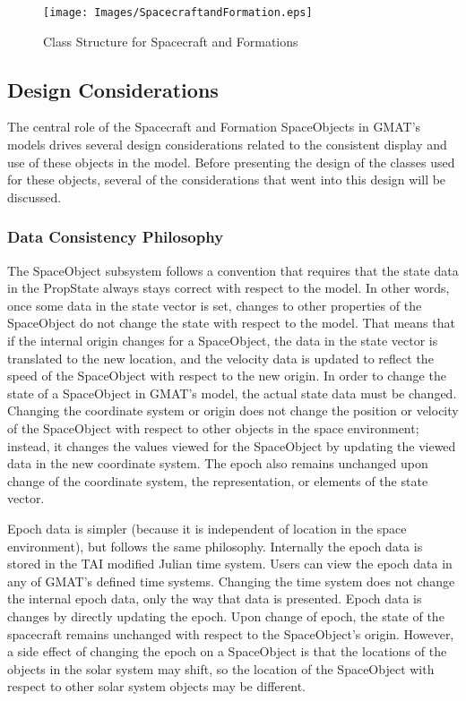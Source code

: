 \begin{figure}
\begin{center}
\texttt{[image: Images/SpacecraftandFormation.eps]}
\caption{\label{figure:SpacecraftandFormation}Class Structure for Spacecraft and Formations}
\end{center}
\end{figure}

\subsection{Design Considerations}

The central role of the Spacecraft and Formation SpaceObjects in GMAT's models drives several
design considerations related to the consistent display and use of these objects in the model.
Before presenting the design of the classes used for these objects, several of the considerations
that went into this design will be discussed.

\subsubsection{Data Consistency Philosophy}

The SpaceObject subsystem follows a convention that requires that the state data in the PropState
always stays correct with respect to the model.  In other words, once some data in the state vector
is set, changes to other properties of the SpaceObject do not change the state with respect to the
model.  That means that if the internal origin changes for a SpaceObject, the data in the state
vector is translated to the new location, and the velocity data is updated to reflect the speed of
the SpaceObject with respect to the new origin.  In order to change the state of a SpaceObject in
GMAT's model, the actual state data must be changed.  Changing the coordinate system or origin does
not change the position or velocity of the SpaceObject with respect to other objects in the space
environment; instead, it changes the values viewed for the SpaceObject by updating the viewed data
in the new coordinate system.  The epoch also remains unchanged upon change of the coordinate
system, the representation, or elements of the state vector.

Epoch data is simpler (because it is independent of location in the space environment), but follows
the same philosophy.  Internally the epoch data is stored in the TAI modified Julian time system.
Users can view the epoch data in any of GMAT's defined time systems.  Changing the time system does
not change the internal epoch data, only the way that data is presented.  Epoch data is changes by
directly updating the epoch.  Upon change of epoch, the state of the spacecraft remains unchanged
with respect to the SpaceObject's origin.  However, a side effect of changing the epoch on a
SpaceObject is that the locations of the objects in the solar system may shift, so the location of
the SpaceObject with respect to other solar system objects may be different.

